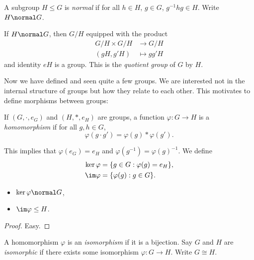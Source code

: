 \documentclass[a4paper]{article}
\theoremstyle{definition}
\begin{document}
\begin{definition}
  A subgroup \(H \leq G\) is \emph{normal} if for all \(h \in H\), \(g \in G\), \(g^{-1}hg \in H\). Write \(H \normal G\).
\end{definition}

\begin{definition}
  If \(H \normal G\), then \(G/H\) equipped with the product
  \begin{align*}
    G/H \times G/H &\to G/H \\
    (gH, g'H) &\mapsto gg'H
  \end{align*}
  and identity \(eH\) is a group. This is the \emph{quotient group} of \(G\) by \(H\).
\end{definition}

Now we have defined and seen quite a few groups. We are interested not in the internal structure of groups but how they relate to each other. This motivates to define morphisms between groups:

\begin{definition}[Homomorphism]
  If \((G, \cdot, e_G)\) and \((H, *, e_H)\) are groups, a function \(\varphi: G \to H\) is a \emph{homomorphism} if for all \(g, h \in G\),
  \[
    \varphi(g \cdot g') = \varphi(g) * \varphi(g').
  \]
\end{definition}

This implies that \(\varphi(e_G) = e_H\) and \(\varphi(g^{-1}) = \varphi(g)^{-1}\). We define
\begin{align*}
  \ker \varphi &= \{g \in G: \varphi(g) = e_H\}, \\
  \im \varphi &= \{\varphi(g): g \in G\}.
\end{align*}

\begin{lemma}\leavevmode
  \begin{itemize}
  \item \(\ker \varphi \normal G\),
  \item \(\im \varphi \leq H\).
  \end{itemize}
\end{lemma}

\begin{proof}
  Easy.
\end{proof}

\begin{definition}[Isomorphism]
  A homomorphism \(\varphi\) is an \emph{isomorphism} if it is a bijection. Say \(G\) and \(H\) are \emph{isomorphic} if there exists some isomorphism \(\varphi: G \to H\). Write \(G \cong H\).
\end{definition}
\end{document}
